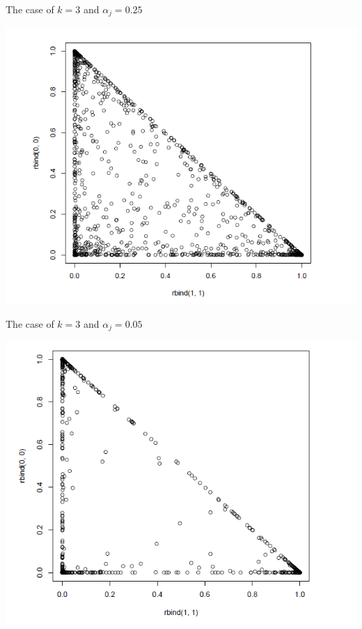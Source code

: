\documentclass[english]{beamer}
\begin{document}
\begin{frame}{The case of $k=3$ and $\alpha_j = 0.25$}
\begin{center}
\includegraphics[scale=0.45]{Images/case3c.png}
\end{center}
\end{frame}
\begin{frame}{The case of $k=3$ and $\alpha_j = 0.05$}
\begin{center}
\includegraphics[scale=0.45]{Images/case3d.png}
\end{center}
\end{frame}
\end{document}
